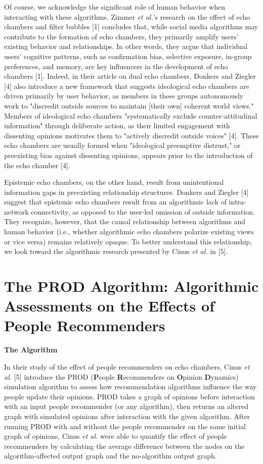 \documentclass[10pt]{article}
\begin{document}
Of course, we acknowledge the significant role of human behavior when interacting with these algorithms. Zimmer \textit{et al.}'s research on the effect of echo chambers and filter bubbles [1] concludes that, while social media algorithms may contribute to the formation of echo chambers, they primarily amplify users' existing behavior and relationships. In other words, they argue that individual users' cognitive patterns, such as confirmation bias, selective exposure, in-group preferences, and memory, are key influencers in the development of echo chambers [1]. Indeed, in their article on dual echo chambers, Donkers and Ziegler [4] also introduce a new framework that suggests ideological echo chambers are driven primarily by user behavior, as members in these groups autonomously work to "discredit outside sources to maintain [their own] coherent world views." Members of ideological echo chambers "systematically exclude counter-attitudinal information" through deliberate action, as their limited engagement with dissenting opinions motivates them to "actively discredit outside voices" [4]. These echo chambers are usually formed when "ideological preemptive distrust," or preexisting bias against dissenting opinions, appears prior to the introduction of the echo chamber [4]. 

Epistemic echo chambers, on the other hand, result from unintentional information gaps in preexisting relationship structures. Donkers and Ziegler [4] suggest that epistemic echo chambers result from an algorithmic lack of intra-network connectivity, as opposed to the user-led omission of outside information. They recognize, however, that the causal relationship between algorithms and human behavior (i.e., whether algorithmic echo chambers polarize existing views or vice versa) remains relatively opaque. To better understand this relationship, we look toward the algorithmic research presented by Cinus \textit{et al.} in [5]. 


\section{The PROD Algorithm: Algorithmic Assessments on the Effects of People Recommenders}
\noindent 
\textbf{The Algorithm}
\indent 

In their study of the effect of people recommenders on echo chambers, Cinus \textit{et al.} [5] introduce the PROD (\textbf{P}eople \textbf{R}ecommenders on \textbf{O}pinion \textbf{D}ynamics) simulation algorithm to assess how recommendation algorithms influence the way people update their opinions. PROD takes a graph of opinions before interaction with an input people recommender (or any algorithm), then returns an altered graph with simulated opinions after interaction with the given algorithm. After running PROD with and without the people recommender on the same initial graph of opinions, Cinus \textit{et al.} were able to quantify the effect of people recommenders by calculating the average difference between the nodes on the algorithm-affected output graph and the no-algorithm output graph. 
\end{document}
